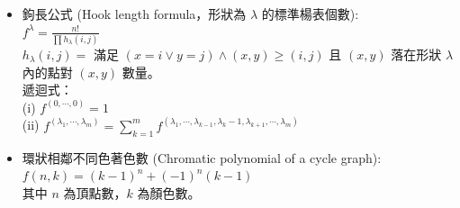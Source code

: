 \begin{itemize}
      一個排列與一對標準楊表 $(P,Q)$ 具有雙射關係。\\
      $P$：排列跑 RSK 演算法的結果，通常為半標準楊表（SSYT）。 \\
      $Q$：可用來還原排列（類似排列矩陣）。
    \item 鉤長公式 (Hook length formula，形狀為 $\lambda$ 的標準楊表個數): \\
      $f^{\lambda }={\frac {n!}{\prod h_{\lambda }(i,j)}}$ \\
      $h_{\lambda }(i,j)=$ 滿足 $(x = i \lor y = j) \land (x,y) \ge (i,j)$ 且 $(x,y)$ 落在形狀 $\lambda$ 內的點對 $(x,y)$ 數量。\\
      遞迴式：\\
      (i) $f^{(0,\cdots,0)} = 1$ \\
      (ii) $f^{(\lambda_{1},\cdots,\lambda_{m})} = \sum_{k=1}^{m} f^{(\lambda_{1},\cdots,\lambda_{k-1},\lambda_{k} - 1,\lambda_{k+1},\cdots,\lambda_{m})} $
    \item 環狀相鄰不同色著色數 (Chromatic polynomial of a cycle graph): \\
      $f(n,k) = (k-1)^n + (-1)^n(k-1)$\\
      其中 $n$ 為頂點數，$k$ 為顏色數。
\end{itemize}